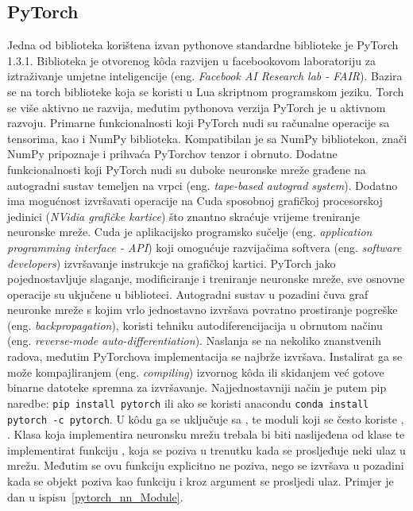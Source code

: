 \subsection{PyTorch}
Jedna od biblioteka korištena izvan pythonove standardne biblioteke je PyTorch 1.3.1. Biblioteka je otvorenog k\^oda razvijen u facebookovom laboratoriju za iztraživanje umjetne inteligencije  (eng. \textit{Facebook AI Research lab - FAIR}). Bazira se na torch biblioteke koja se koristi u Lua skriptnom programskom jeziku. Torch se više aktivno ne razvija, međutim pythonova verzija PyTorch je u aktivnom razvoju. Primarne funkcionalnosti koji PyTorch nudi su računalne operacije sa tensorima, kao i NumPy biblioteka. Kompatibilan je sa NumPy bibliotekon, znači NumPy pripoznaje i prihvaća PyTorchov tenzor i obrnuto. Dodatne funkcionalnosti koji PyTorch nudi su duboke neuronske mreže građene na autogradni sustav temeljen na vrpci (eng. \textit{tape-based autograd system}). Dodatno ima mogućnost izvršavati operacije na Cuda sposobnoj grafičkoj procesorskoj jedinici (\emph{NVidia grafičke kartice}) što znantno skraćuje vrijeme treniranje neuronske mreže. Cuda je aplikacijsko programsko sučelje (eng. \textit{application programming interface - API}) koji omogućuje razvijačima softvera (eng. \textit{software developers}) izvršavanje instrukcje na grafičkoj kartici. PyTorch jako pojednostavljuje slaganje, modificiranje i treniranje neuronske mreže, sve osnovne operacije su ukjučene u biblioteci. Autogradni sustav u pozadini čuva graf neuronke mreže s kojim vrlo jednostavno izvršava povratno prostiranje pogreške (eng. \textit{backpropagation}), koristi tehniku autodiferencijacija u obrnutom načinu (eng. \textit{reverse-mode auto-differentiation}). Naslanja se na nekoliko znanstvenih radova, međutim PyTorchova implementacija se najbrže izvršava. Instalirat ga se može kompajliranjem (eng. \textit{compiling}) izvornog k\^oda ili skidanjem već gotove binarne datoteke spremna za izvršavanje. Najjednostavniji način je putem pip naredbe: \lstinline$pip install pytorch$ ili ako se koristi anacondu \lstinline$conda install pytorch -c pytorch$. U k\^odu ga se uključuje sa , te moduli koji se često koriste , . Klasa koja implementira neuronsku mrežu trebala bi biti naslijeđena od klase  te implementirat funkciju , koja se poziva u trenutku kada se prosljeđuje neki ulaz u mrežu. Međutim se ovu funkciju explicitno ne poziva, nego se izvršava u pozadini kada se objekt poziva kao funkciju i kroz argument se prosljedi ulaz. Primjer je dan u ispisu~\ref{pytorch_nn_Module}.
{}

